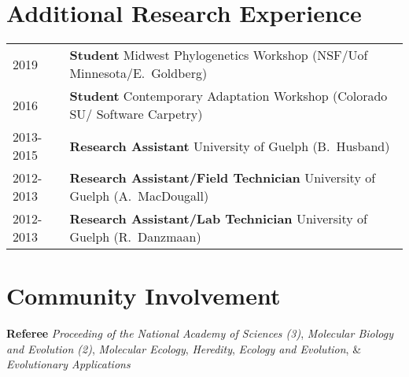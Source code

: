 \documentclass[12pt]{article}
\begin{document}
\bigskip 



\section*{Additional Research Experience}

\begin{tabular}{ll}

2019 & \textbf{Student} Midwest Phylogenetics Workshop (NSF/Uof Minnesota/E.\ Goldberg)\\
2016 &  \textbf{Student} Contemporary Adaptation Workshop (Colorado SU/ Software Carpetry)\\
2013-2015 & \textbf{Research Assistant} University of Guelph (B.\ Husband) \\
2012-2013 & \textbf{Research Assistant/Field Technician} University of Guelph (A.\ MacDougall) \\
2012-2013 & \textbf{Research Assistant/Lab Technician} University of Guelph (R.\ Danzmaan) \\

\end{tabular}



\section*{Community Involvement}

\noindent \textbf{Referee} \textit{Proceeding of the National Academy of Sciences (3)}, \textit{Molecular Biology and Evolution (2)}, \textit{Molecular Ecology}, \textit{Heredity}, \textit{Ecology and Evolution}, \& \textit{Evolutionary Applications}   \\
\end{document}
